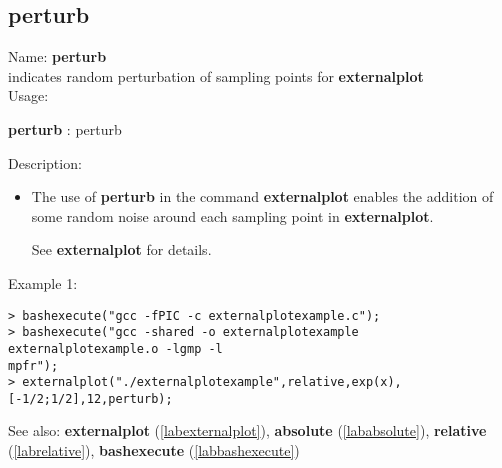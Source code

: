 \subsection{perturb}
\label{labperturb}
\noindent Name: \textbf{perturb}\\
indicates random perturbation of sampling points for \textbf{externalplot}\\
\noindent Usage: 
\begin{center}
\textbf{perturb} : \textsf{perturb}
\\ 
\end{center}
\noindent Description: \begin{itemize}

\item The use of \textbf{perturb} in the command \textbf{externalplot} enables the addition
   of some random noise around each sampling point in \textbf{externalplot}.
    
   See \textbf{externalplot} for details.
\end{itemize}
\noindent Example 1: 
\begin{center}\begin{minipage}{15cm}\begin{Verbatim}[frame=single]
> bashexecute("gcc -fPIC -c externalplotexample.c");
> bashexecute("gcc -shared -o externalplotexample externalplotexample.o -lgmp -l
mpfr");
> externalplot("./externalplotexample",relative,exp(x),[-1/2;1/2],12,perturb);
\end{Verbatim}
\end{minipage}\end{center}
See also: \textbf{externalplot} (\ref{labexternalplot}), \textbf{absolute} (\ref{lababsolute}), \textbf{relative} (\ref{labrelative}), \textbf{bashexecute} (\ref{labbashexecute})
